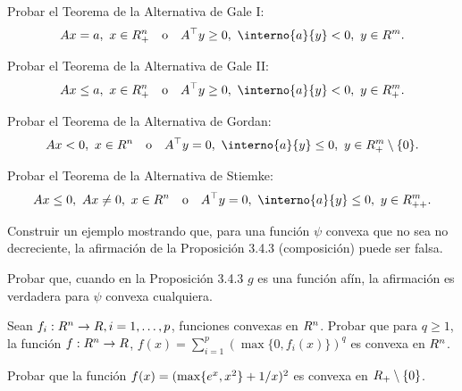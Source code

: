 \begin{exercise}\label{v1:ejer:3.3.2}
 Probar el Teorema de la Alternativa de Gale I:
 \[
 Ax = a, \ x \in \R_+^n \quad \text{o} \quad A^\top y \ge 0, \ \interno{a}{y} < 0, \ y \in \R^m.
 \]
\end{exercise}

\begin{exercise}\label{v1:ejer:3.3.3}
 Probar el Teorema de la Alternativa de Gale II:
 \[
 Ax \le a, \ x \in \R_+^n \quad \text{o} \quad A^\top y \ge 0, \ \interno{a}{y} < 0, \ y \in \R_+^m.
 \]
\end{exercise}

\begin{exercise}\label{v1:ejer:3.3.4}
 Probar el Teorema de la Alternativa de Gordan:
 \[
 Ax < 0, \ x \in \Rn \quad \text{o} \quad A^\top y = 0, \ \interno{a}{y} \le 0, \ y \in \R_+^m \setminus \{0\}.
 \]
\end{exercise}

\begin{exercise}\label{v1:ejer:3.3.5}
 Probar el Teorema de la Alternativa de Stiemke:
 \[
 Ax \le 0, \ Ax \neq 0, \ x \in \Rn \quad \text{o} \quad A^\top y = 0, \ \interno{a}{y} \le 0, \ y \in \R_{++}^m.
 \]
\end{exercise}


\begin{exercise}\label{v1:ejer:3.4.1}
 Construir un ejemplo mostrando que, para una función $\psi$ convexa que no sea no decreciente, la afirmación de la Proposición 3.4.3 (composición) puede ser falsa.
\end{exercise}

\begin{exercise}\label{v1:ejer:3.4.2}
 Probar que, cuando en la Proposición 3.4.3 $g$ es una función afín, la afirmación es verdadera para $\psi$ convexa cualquiera.
\end{exercise}

\begin{exercise}\label{v1:ejer:3.4.3}
 Sean $f_i : R^n \to R, i=1,\dots,p$, funciones convexas en $R^n$. Probar que para $q \ge 1$, la función $f : R^n \to R$, $f(x) = \sum_{i=1}^p (\max\{0, f_i(x)\})^q$ es convexa en $R^n$.
\end{exercise}

\begin{exercise}\label{v1:ejer:3.4.4}
 Probar que la función $f(x) = (\max\{e^x, x^2\} + 1/x)^2$ es convexa en $R_+ \setminus \{0\}$.
\end{exercise}

